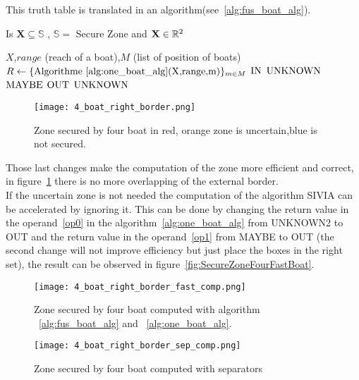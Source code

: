 This truth table is translated in an algorithm(see~\ref{alg:fus_boat_alg}).

\begin{algorithm}[H]
\caption{Is $\mathbf{X} \subseteq \mathbb{S}$ , $\mathbb{S} =$ Secure Zone and $\mathbf{X} \in \mathbb{R^{\textnormal{\ensuremath{2}}}}$ }
\label{alg:fus_boat_alg}
\begin{algorithmic}[1]
\REQUIRE $X$,$range $ (reach of a boat),$M$ (list of position of boats)
\STATE $R \leftarrow \{\textnormal{Algorithme$~\ref{alg:one_boat_alg}
$(X,range,m)}\}_{m\in M}$
\RETURN $\textnormal{IN}$
\RETURN $\textnormal{UNKNOWN}$
\RETURN $\textnormal{MAYBE}$
\RETURN $\textnormal{OUT}$
\ELSE
\RETURN $\textnormal{UNKNOWN}$
\ENDIF
\end{algorithmic}
\end{algorithm}

\begin{figure}[H]
\centering
    \texttt{[image: 4\_boat\_right\_border.png]}
    \caption{Zone secured by four boat in red, orange zone is uncertain,blue is not secured.}
    \label{fig:SecureZoneFourBoat}
\end{figure}


Those last changes make the computation of the zone more efficient and correct, in figure~\ref{fig:SecureZoneFourBoat} there is no more overlapping of the external border.\\
If the uncertain zone is not needed the computation of the algorithm SIVIA can be accelerated by ignoring it. This can be done by changing the return value in the operand~\ref{op0} in the algorithm~\ref{alg:one_boat_alg} from UNKNOWN2 to OUT and the return value in the operand~\ref{op1} from MAYBE to OUT (the second change will not improve efficiency but just place the boxes in the right set), the result can be observed in figure~\ref{fig:SecureZoneFourFastBoat}.

\begin{figure}[H]
\centering
    \begin{minipage}[b]{0.4\textwidth}
    \texttt{[image: 4\_boat\_right\_border\_fast\_comp.png]}
    \caption{Zone secured by four boat computed with algorithm ~\ref{alg:fus_boat_alg} and ~\ref{alg:one_boat_alg}.}
    \label{fig:SecureZoneFourFastBoat}
    \end{minipage}
    \begin{minipage}[b]{0.4\textwidth}
    \texttt{[image: 4\_boat\_right\_border\_sep\_comp.png]}
    \caption{Zone secured by four boat computed with separators}
    \label{fig:SecureZoneFourSepBoat}
    \end{minipage}
\end{figure}

